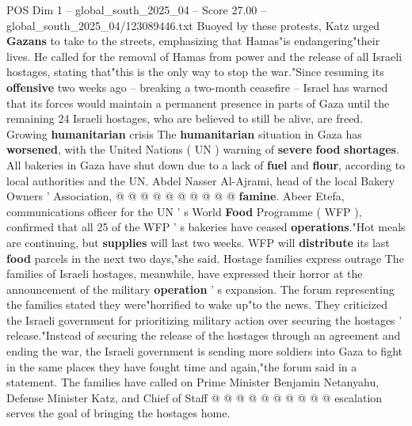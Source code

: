 \begin{textsample}{POS Dim 1 – global\_south\_2025\_04 – Score 27.00 – global\_south\_2025\_04/123089446.txt}
Buoyed by these protests, Katz urged \textbf{Gazans} to take to the streets, emphasizing that Hamas"is endangering"their lives.
He called for the removal of Hamas from power and the release of all Israeli hostages, stating that"this is the only way to stop the war."Since resuming its \textbf{offensive} two weeks ago -- breaking a two-month ceasefire -- Israel has warned that its forces would maintain a permanent presence in parts of Gaza until the remaining 24 Israeli hostages, who are believed to still be alive, are freed.
Growing \textbf{humanitarian} crisis The \textbf{humanitarian} situation in Gaza has \textbf{worsened}, with the United Nations ( UN ) warning of \textbf{severe} \textbf{food} \textbf{shortages}.
All bakeries in Gaza have shut down due to a lack of \textbf{fuel} and \textbf{flour}, according to local authorities and the UN.
Abdel Nasser Al-Ajrami, head of the local Bakery Owners ' Association, @ @ @ @ @ @ @ @ @ @ \textbf{famine}.
Abeer Etefa, communications officer for the UN ' s World \textbf{Food} Programme ( WFP ), confirmed that all 25 of the WFP ' s bakeries have ceased \textbf{operations}."Hot meals are continuing, but \textbf{supplies} will last two weeks.
WFP will \textbf{distribute} its last \textbf{food} parcels in the next two days,"she said.
Hostage families express outrage The families of Israeli hostages, meanwhile, have expressed their horror at the announcement of the military \textbf{operation} ' s expansion.
The forum representing the families stated they were"horrified to wake up"to the news.
They criticized the Israeli government for prioritizing military action over securing the hostages ' release."Instead of securing the release of the hostages through an agreement and ending the war, the Israeli government is sending more soldiers into Gaza to fight in the same places they have fought time and again,"the forum said in a statement.
The families have called on Prime Minister Benjamin Netanyahu, Defense Minister Katz, and Chief of Staff @ @ @ @ @ @ @ @ @ @ escalation serves the goal of bringing the hostages home.

\end{textsample}
